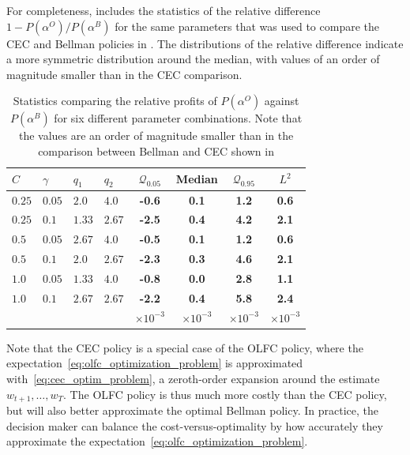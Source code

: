 \documentclass[main.tex]{subfiles}
\begin{document}
For completeness,  includes the statistics of the relative
difference $1-P(\alpha^O)/P(\alpha^B)$ for the same parameters
that was used to compare the CEC and Bellman policies in .
The distributions of the relative difference indicate a more symmetric
distribution around the median, with values of an order of magnitude
smaller than in the CEC comparison.
\begin{table}[htbp]
  \centering
  \begin{tabular}{llllcccc}
    \toprule
    $C$ & $\gamma$ & $q_1$ & $q_2$ & $\mathcal Q_{0.05}$
    &Median & $\mathcal Q_{0.95}$ &$L^2$\\
    \midrule
    $0.25$ & $0.05$ & $2.0$ & $4.0$
                                   & \textbf{-0.6} & \textbf{0.1} & \textbf{1.2} & \textbf{0.6} \\
    $0.25$ & $0.1$ & $1.33$ & $2.67$
                                   & \textbf{-2.5} & \textbf{0.4} & \textbf{4.2} & \textbf{2.1} \\
    $0.5$ & $0.05$ & $2.67$ & $4.0$
                                   & \textbf{-0.5} & \textbf{0.1} & \textbf{1.2} & \textbf{0.6} \\
    $0.5$ & $0.1$ & $2.0$ & $2.67$
                                   & \textbf{-2.3} & \textbf{0.3} & \textbf{4.6} & \textbf{2.1} \\
    $1.0$ & $0.05$ & $1.33$ & $4.0$
                                   & \textbf{-0.8} & \textbf{0.0} & \textbf{2.8} & \textbf{1.1} \\
    $1.0$ & $0.1$ & $2.67$ & $2.67$
                                   & \textbf{-2.2} & \textbf{0.4} & \textbf{5.8} & \textbf{2.4} \\
        &&&&$\times 10^{-3}$&$\times 10^{-3}$&$\times 10^{-3}$&$\times 10^{-3}$\\
    \bottomrule
  \end{tabular}
  \caption{Statistics comparing the relative profits of $P(\alpha^O)$
    against $P(\alpha^B)$ for six different
    parameter combinations. Note that the values are an order of magnitude
    smaller than in the comparison between Bellman and CEC shown in }\label{tbl:paramcomparisons_olfc}
\end{table}

Note that the CEC policy is a special case of the OLFC policy, where the
expectation~\eqref{eq:olfc_optimization_problem} is approximated with~\eqref{eq:cec_optim_problem}, a zeroth-order expansion around
the estimate $w_{t+1},\dots,w_T$.
The OLFC policy is thus much more costly than the CEC policy, but will
also better approximate the optimal Bellman policy. In practice, the
decision maker can balance the cost-versus-optimality by how
accurately they
approximate the expectation~\eqref{eq:olfc_optimization_problem}.

\biblio
\end{document}
